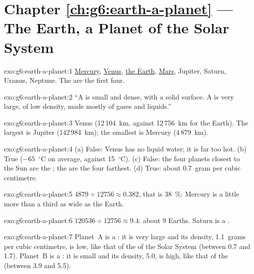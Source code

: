 \section*{Chapter \ref{ch:g6:earth-a-planet} --- The Earth, a Planet of the Solar System}

\begin{solution}{exo:g6:earth-a-planet:1}
\underline{Mercury}, \underline{Venus}, \underline{the Earth},
\underline{Mars}, Jupiter, Saturn, Uranus, Neptune. The  are
the first four.
\end{solution}

\begin{solution}{exo:g6:earth-a-planet:2}
``A  is small and dense, with a solid surface. A 
is very large, of low density, made mostly of gases and liquids.''
\end{solution}

\begin{solution}{exo:g6:earth-a-planet:3}
Venus (12\,104~km, against 12\,756~km for the Earth). The largest is
Jupiter (142\,984~km); the smallest is Mercury (4\,879~km).
\end{solution}

\begin{solution}{exo:g6:earth-a-planet:4}
(a) False: Venus has no liquid water; it is far too hot. (b) True
($-65$~$^\circ$C on average, against 15~$^\circ$C). (c) False: the four
planets closest to the Sun are the ; the  are the
four farthest. (d) True: about 0.7~gram per cubic centimetre.
\end{solution}

\begin{solution}{exo:g6:earth-a-planet:5}
$4879 \div 12756 \approx 0.382$, that is 38~\%: Mercury is a little more
than a third as wide as the Earth.
\end{solution}

\begin{solution}{exo:g6:earth-a-planet:6}
$120536 \div 12756 \approx 9.4$: about 9 Earths. Saturn is a .
\end{solution}

\begin{solution}{exo:g6:earth-a-planet:7}
Planet~A is a : it is very large and its density, 1.1~grams per
cubic centimetre, is low, like that of the  of the Solar System
(between 0.7 and 1.7). Planet~B is a : it is small and its
density, 5.0, is high, like that of the  (between 3.9 and
5.5).
\end{solution}

